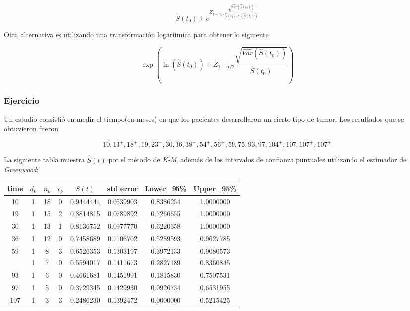 \documentclass[
  a4paper,
  oneside,
  openany]{book}
\begin{document}
\[
\hat{S}(t_{0}) \pm e^{Z_{1-\alpha/2} \frac{\sqrt{\hat{Var}(\hat{S}(t_0))}}{\hat{S}(t_{0})\ln(\hat{S}(t_{0}))}}
\]

Otra alternativa es utilizando una transformación logarítmica para obtener lo siguiente

\[
\exp\left(\ln(\hat{S}(t_{0})) \pm Z_{1-\alpha/2} \frac{\sqrt{\hat{Var}(\hat{S}(t_0))}}{\hat{S}(t_{0})}\right)
\]

\hypertarget{ejercicio-1}{%
\subsubsection*{Ejercicio}\label{ejercicio-1}}


Un estudio consistió en medir el tiempo(en meses) en que los pacientes desarrollaron un cierto tipo de tumor. Los resultados que se obtuvieron fueron:

\[
10,13^+,18^+,19,23^+,30,36,38^+,54^+,56^+,59,75,93,97,104^+,107,107^+,107^+
\]

La siguiente tabla muestra \(\hat S(t)\) por el método de \emph{K-M}, además de los intervalos de confianza puntuales utilizando el estimador de \emph{Greenwood}:

\begin{table}
\centering
\begin{tabular}{cccccccc}
\toprule
time & $d_k$ & $n_k$ & $c_k$ & $S(t)$ & std error & Lower\_95\% & Upper\_95\%\\
\midrule
10 & 1 & 18 & 0 & 0.9444444 & 0.0539903 & 0.8386254 & 1.0000000\\
19 & 1 & 15 & 2 & 0.8814815 & 0.0789892 & 0.7266655 & 1.0000000\\
30 & 1 & 13 & 1 & 0.8136752 & 0.0977770 & 0.6220358 & 1.0000000\\
36 & 1 & 12 & 0 & 0.7458689 & 0.1106702 & 0.5289593 & 0.9627785\\
59 & 1 & 8 & 3 & 0.6526353 & 0.1303197 & 0.3972133 & 0.9080573\\
\addlinespace
75 & 1 & 7 & 0 & 0.5594017 & 0.1411673 & 0.2827189 & 0.8360845\\
93 & 1 & 6 & 0 & 0.4661681 & 0.1451991 & 0.1815830 & 0.7507531\\
97 & 1 & 5 & 0 & 0.3729345 & 0.1429930 & 0.0926734 & 0.6531955\\
107 & 1 & 3 & 3 & 0.2486230 & 0.1392472 & 0.0000000 & 0.5215425\\
\bottomrule
\end{tabular}
\end{table}
\end{document}
